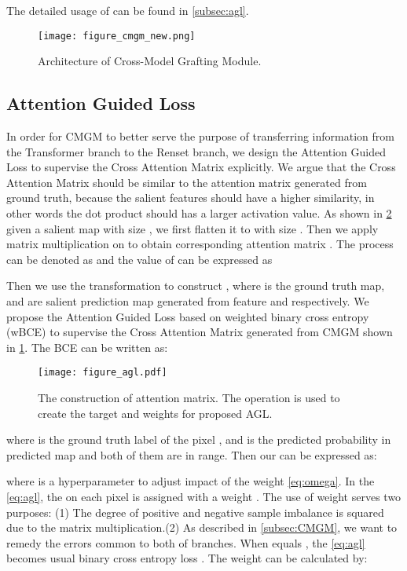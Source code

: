 \documentclass[10pt,twocolumn,letterpaper]{article}
\begin{document}
The detailed usage of  can be found in \cref{subsec:agl}.


\begin{figure}[t]

\centering
\texttt{[image: figure\_cmgm\_new.png]}
\caption{Architecture of Cross-Model Grafting Module. }
\label{fig:cmgm}
\end{figure}
\label{subsec:CMGM}


\subsection{Attention Guided Loss}
In order for CMGM  to better serve the purpose of transferring information from the Transformer branch to the Renset branch, we design the Attention Guided Loss to supervise the Cross Attention Matrix explicitly. We argue that the Cross Attention Matrix should be similar to the attention matrix generated from ground truth, because the salient features should have a higher similarity, in other words the dot product should has a larger activation value.
As shown in \cref{fig:agl1} given a salient map  with size , we first flatten it to  with size . Then we apply matrix multiplication on  to obtain corresponding attention matrix . The process can be denoted as  and the value of  can be expressed as 



Then we use the transformation  to construct , where  is the ground truth map,  and  are salient prediction map generated from feature  and  respectively. We propose the Attention Guided Loss based on weighted binary cross entropy (wBCE) to supervise the Cross Attention Matrix  generated from CMGM shown in \cref{fig:cmgm}. The BCE \cite{de2005tutorial} can be written as:

\begin{figure}[ht]
\centering
\texttt{[image: figure\_agl.pdf]}
\caption{The construction of attention matrix. The operation is used to create the target and weights for proposed AGL. }
\label{fig:agl1}
\end{figure}


where  is the ground truth label of the pixel , and  is the predicted probability in predicted map and both of them are in range. Then our  can be expressed as:

where  is a hyperparameter to adjust impact of the weight  \cref{eq:omega}. In the \cref{eq:agl}, the  on each pixel is assigned with a weight . The use of weight  serves two purposes: (1) The degree of positive and negative sample imbalance is squared due to the matrix multiplication.(2) As described in \cref{subsec:CMGM}, we want to remedy the errors common to both of branches. When  equals  , the \cref{eq:agl} becomes usual binary cross entropy loss . The weight  can be calculated by:
\end{document}
